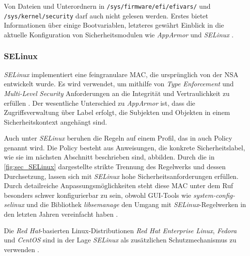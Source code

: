 \documentclass[../main.tex]{subfiles}
\begin{document}
{				Von Dateien und Unterordnern in \texttt{/sys/firmware/efi/efivars/} und \texttt{/sys/kernel/security} darf auch nicht gelesen werden. Erstes bietet Informationen über einige Bootvariablen, letzteres gewährt Einblick in die aktuelle Konfiguration von Sicherheitsmodulen wie \emph{AppArmor} und \emph{SELinux} \cite{apparmorEFI}\cite{apparmorSecurityFS}\cite{apparmorLWNSecurityFS}.

  		\subsubsection{\acrshort{SELinux}}
				\emph{SELinux} implementiert eine feingranulare MAC, die ursprünglich von der NSA entwickelt wurde. Es wird verwendet, um mithilfe von \emph{Type Enforcement} und \emph{Multi-Level Security} Anforderungen an die Integrität und Vertraulichkeit zu erfüllen \cite{redhatSec}. %
				Der wesentliche Unterschied zu \emph{AppArmor} ist, dass die Zugriffsverwaltung über Label erfolgt, die Subjekten und Objekten in einem Sicherheitskontext angehängt sind.


				Auch unter \emph{SELinux} beruhen die Regeln auf einem Profil, das in auch Policy genannt wird. Die Policy besteht aus Anweisungen, die konkrete Sicherheitslabel, wie sie im nächsten Abschnitt beschrieben sind, abbilden. Durch die in \fig \ref{fig:sec_SELinux} dargestellte strikte Trennung des Regelwerks und dessen Durchsetzung, lassen sich mit \emph{SELinux} hohe Sicherheitsanforderungen erfüllen. Durch detailreiche Anpassungsmöglichkeiten steht diese MAC unter dem Ruf besonders schwer konfigurierbar zu sein, obwohl GUI-Tools wie \emph{system-config-selinux} und die Bibliothek \emph{libsemanage} den Umgang mit \emph{SELinux}-Regelwerken in den letzten Jahren vereinfacht haben \cite[S.62,S.67]{linuxMagazineSec}.

				Die \emph{Red Hat}-basierten Linux-Distributionen \emph{Red Hat Enterprise Linux}, \emph{Fedora} und \emph{CentOS} sind in der Lage \emph{SELinux} als zusätzlichen Schutzmechanismus zu verwenden \cite{dockerSecurity}.

}
\end{document}
